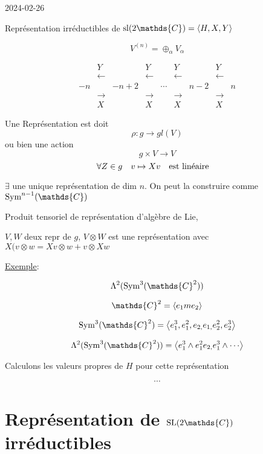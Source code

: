 


2024-02-26


\begin{tcolorbox}[title=Rappels]
	Représentation irréductibles de \({\rm{}sl}(2 \mathds{C}) = \expval{H, X, Y}\)

\[ V^{(n)} = \oplus_{\alpha} V_{\alpha}  \]

\[ \begin{matrix} &Y && Y && Y && Y \\ &\leftarrow&&\leftarrow&&\leftarrow&&\leftarrow\\ -n && -n+2 &&\dotsb && n-2 && n \\ &\rightarrow&&\rightarrow&&\rightarrow&&\rightarrow\\
& X&&X&&X&&X\end{matrix} \]
	 
\end{tcolorbox}

\begin{tcolorbox}[title=Notation]
	Une Représentation est doit 
	\[ \rho: g \to gl(V) \] ou bien une action \[ g \times  V \to V \] 
	\[ \forall Z \in g \quad v \mapsto Xv \qq{est linéaire}\]

	\(\exists\) une unique représentation de dim \(n\). On peut la construire comme \(\sym^{n-1} (\mathds{C})\)

	Produit tensoriel de représentation d'algèbre de Lie, 

	\(V,W\) deux repr de \(g\), \(V \otimes W\) est une représentation avec \(X(v \otimes w = X v \otimes w + v \otimes Xw \)
\end{tcolorbox}


\underline{Exemple}:

\[ \Lambda^{2}(\sym^{3}(\mathds{C}^2)) \]

\[ \mathds{C}^2 = \expval{e_{1}m e_2} \]

\[ \sym^{3}(\mathds{C}^2) = \expval{e_1^{3}, e_1^{2}, e_{2,} e_{1,} e_2^{2}, e_2^{3}} \]

\[ \Lambda^{2}(\sym^3( \mathds{C}^2)) = \expval{e_1^{3} \wedge e_1^{2}e_{2,} e_1^{3}\wedge \dotsb} \]

Calculons les valeurs propres de \(H\) pour cette représentation 

\[ \dotsb \]

\section*{Représentation de \({\rm{}SL}(2 \mathds{C})\) irréductibles}

